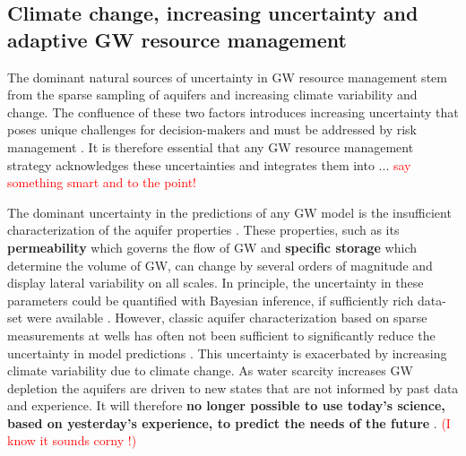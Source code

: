 \documentclass[11pt,final]{article}%
\newcommand{\note}[1]{\textcolor{red}{ #1}}
\begin{document}



\subsection{Climate change, increasing uncertainty and adaptive GW resource management}\label{sec:adaptive}
The dominant natural sources of uncertainty in GW resource management stem from the sparse sampling of aquifers and increasing climate variability and change. The confluence of these two factors introduces increasing uncertainty that poses unique challenges for decision-makers and must be addressed by risk management \cite{Shaw2010}. It is therefore essential that any GW resource management strategy acknowledges these uncertainties and integrates them into ... \note{say something smart and to the point!} 

The dominant uncertainty in the predictions of any GW model is the insufficient characterization of the aquifer properties \cite{Eaton2006,Bohling2010,Oliver2011}. These properties, such as its \textbf{permeability} which governs the flow of GW and \textbf{specific storage} which determine the volume of GW, can change by several orders of magnitude and display lateral variability on all scales. In principle, the uncertainty in these parameters could be quantified with Bayesian inference, if sufficiently rich data-set were available \cite{Carrera1986a,Carrera1986b,McLaughlin1996}. However, classic aquifer characterization based on sparse measurements at wells has often not been sufficient to significantly reduce the uncertainty in model predictions \cite{Bohling2010}. This uncertainty is exacerbated by increasing climate variability due to climate change. As water scarcity increases GW depletion the aquifers are driven to new states that are not informed by past data and experience. 
It will therefore \textbf{no longer possible to use today’s science, based on yesterday’s experience, to predict the needs of the future} \cite{Turton2007}. \note{(I know it sounds corny !)}
\end{document}
